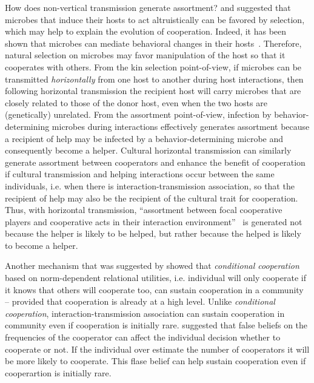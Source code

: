 \documentclass[12pt]{extarticle}
\begin{document}
How does non-vertical transmission generate assortment? 
\citet{lewin2017microbes} and \citet{lewin2020rockpaperscissors} 
suggested that microbes that induce their hosts to act altruistically can be favored by selection, which may help to explain the evolution of cooperation. 
Indeed, it has been shown that microbes can mediate behavioral changes in their  hosts~\citep{dobson1988population,poulin2010parasite}. 
Therefore, natural selection on microbes may favor manipulation of the host so that it cooperates with others.
From the kin selection point-of-view, if microbes can be transmitted \emph{horizontally} from one host to another during host interactions, then following horizontal transmission the recipient host will carry microbes that are closely related to those of the donor host, 
even when the two hosts are (genetically) unrelated. 
From the assortment point-of-view,
infection by behavior-determining microbes during interactions effectively generates assortment because a recipient of help may be infected by a behavior-determining microbe and consequently become a helper.
Cultural horizontal transmission can similarly generate assortment between cooperators and enhance the benefit of cooperation if cultural transmission and helping interactions occur between the same individuals, i.e. when there is interaction-transmission association, so that the recipient of help may also be the recipient of the cultural trait for cooperation. 
Thus, with horizontal transmission, ``assortment between focal cooperative players and cooperative acts in their interaction
environment''~\citep{Fletcher2009assortment} is generated not because the helper is likely to be helped, but rather because the helped is likely to become a helper.

Another mechanism that was suggested by \citet{traxler2011social} showed that \emph{conditional cooperation} based on norm-dependent relational utilities, i.e. individual will only cooperate if it knows that others will cooperate too, can sustain cooperation in a community – provided that cooperation is already at a high level.
Unlike \emph{conditional cooperation}, interaction-transmission association can sustain cooperation in community even if cooperation is initially rare. 
\citet{morsky2020false} suggested that false beliefs on the frequencies of the cooperator can affect the individual decision whether to cooperate or not. If the individual over estimate the number of cooperators it will be more likely to cooperate. This flase belief can help sustain cooperation even if cooperartion is initially rare. 
\end{document}
